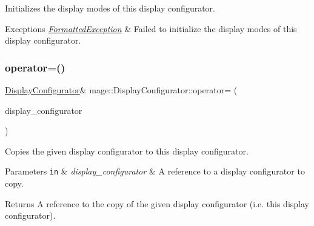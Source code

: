 Initializes the display modes of this display configurator.


\begin{DoxyExceptions}{Exceptions}
{\em \hyperlink{classmage_1_1_formatted_exception}{Formatted\+Exception}} & Failed to initialize the display modes of this display configurator. \\
\hline
\end{DoxyExceptions}
\hypertarget{classmage_1_1_display_configurator_adf24194f83a0971a1c3076c1a23d1699}{}\label{classmage_1_1_display_configurator_adf24194f83a0971a1c3076c1a23d1699} 
\subsubsection{\texorpdfstring{operator=()}{operator=()}\hspace{0.1cm}{\footnotesize\ttfamily [1/2]}}
{\footnotesize\ttfamily \hyperlink{classmage_1_1_display_configurator}{Display\+Configurator}\& mage\+::\+Display\+Configurator\+::operator= (\begin{DoxyParamCaption}\item[{const \hyperlink{classmage_1_1_display_configurator}{Display\+Configurator} \&}]{display\+\_\+configurator }\end{DoxyParamCaption})\hspace{0.3cm}{\ttfamily [delete]}}

Copies the given display configurator to this display configurator.


\begin{DoxyParams}[1]{Parameters}
\mbox{\tt in}  & {\em display\+\_\+configurator} & A reference to a display configurator to copy. \\
\hline
\end{DoxyParams}
\begin{DoxyReturn}{Returns}
A reference to the copy of the given display configurator (i.\+e. this display configurator). 
\end{DoxyReturn}
\hypertarget{classmage_1_1_display_configurator_a9d98a955cdbaf3bfe8913a4b561ad08d}{}\label{classmage_1_1_display_configurator_a9d98a955cdbaf3bfe8913a4b561ad08d} 
